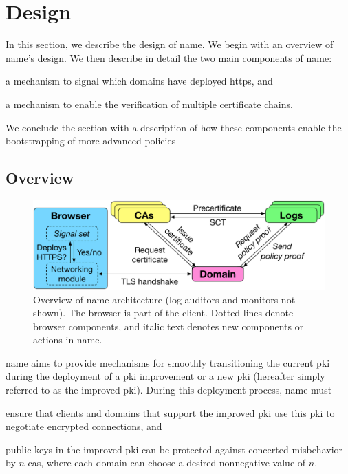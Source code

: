 \section{Design}
\label{sec:design}

In this section, we describe the design of \ac{name}. We begin with an overview
of \ac{name}'s design. We then describe in detail the two main components of
\ac{name}:
\begin{inparaenum}[(1)]
\item a mechanism to signal which domains have deployed \ac{https}, and
\item a mechanism to enable the verification of multiple certificate chains.
\end{inparaenum}
We conclude the section with a description of how these components enable the
bootstrapping of more advanced policies 

\subsection{Overview}
\label{sec:design:overview}

\begin{figure}
  \centering \includegraphics[width=\linewidth]{fig/overview} \caption{Overview
    of \ac{name} architecture (log auditors and monitors not shown). The browser
    is part of the client. Dotted lines denote browser components, and italic
  text denotes new components or actions in \ac{name}. }
  \label{fig:overview}
\end{figure}

\ac{name} aims to provide mechanisms for smoothly transitioning the current
\ac{pki} during the deployment of a \ac{pki} improvement or a new \ac{pki}
(hereafter simply referred to as the improved \ac{pki}). During this deployment
process, \ac{name} must
\begin{inparaenum}[(1)]
\item ensure that clients and domains that support the improved \ac{pki} use
  this \ac{pki} to negotiate encrypted connections, and
\item public keys in the improved \ac{pki} can be protected against concerted
  misbehavior by $n$ \acp{ca}, where each domain can choose a desired
  nonnegative value of $n$.
\end{inparaenum}

